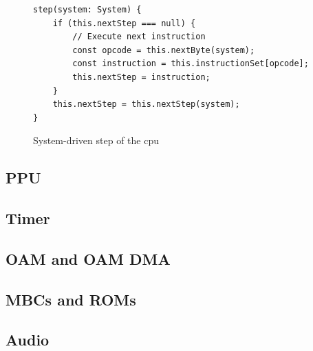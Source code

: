 \documentclass[11pt]{report}
\begin{document}
\begin{figure}[h]
    \begin{verbatim}
step(system: System) {
    if (this.nextStep === null) {
        // Execute next instruction
        const opcode = this.nextByte(system);
        const instruction = this.instructionSet[opcode];
        this.nextStep = instruction;
    }
    this.nextStep = this.nextStep(system);
}
    \end{verbatim}
    \caption{System-driven step of the \gls{cpu}}
    \label{fig:system-driven-cpu-tick}
\end{figure}

\subsection{PPU}
\subsection{Timer}
\subsection{OAM and OAM DMA}
\subsection{MBCs and ROMs}
\subsection{Audio}


\clearpage

{}
{\hypersetup{hidelinks}
    \listoffigures
}
\end{document}
